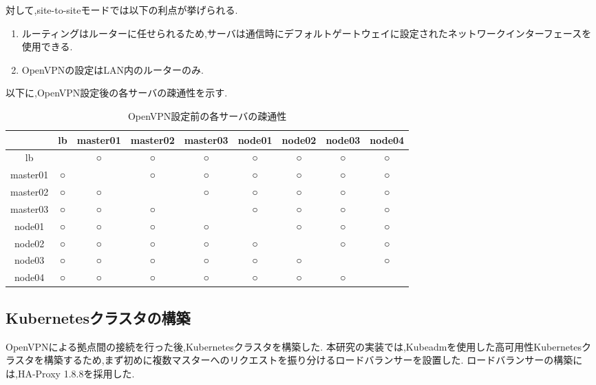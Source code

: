 対して,site-to-siteモードでは以下の利点が挙げられる.

\begin{enumerate}
  \item ルーティングはルーターに任せられるため,サーバは通信時にデフォルトゲートウェイに設定されたネットワークインターフェースを使用できる.
  \item OpenVPNの設定はLAN内のルーターのみ.
\end{enumerate}

以下に,OpenVPN設定後の各サーバの疎通性を示す.

\begin{table}[htb]
  \begin{center}
    \caption{OpenVPN設定前の各サーバの疎通性}
    \begin{tabular}{|c|c|c|c|c|c|c|c|c|} \hline
      & lb & master01 & master02 & master03 & node01 & node02 & node03 & node04 \\ \hline
      lb & \ & ○ & ○ & ○ & ○ & ○ & ○ & ○ \\ \hline
      master01 & ○ & \ & ○ & ○ & ○ & ○ & ○ & ○ \\ \hline
      master02 & ○ & ○ & \ & ○ & ○ & ○ & ○ & ○ \\ \hline
      master03 & ○ & ○ & ○ & \ & ○ & ○ & ○ & ○ \\ \hline
      node01 & ○ & ○ & ○ & ○ & \ & ○ & ○ & ○ \\ \hline
      node02 & ○ & ○ & ○ & ○ & ○ & \ & ○ & ○ \\ \hline
      node03 & ○ & ○ & ○ & ○ & ○ & ○ & \ & ○ \\ \hline
      node04 & ○ & ○ & ○ & ○ & ○ & ○ & ○ & \ \\ \hline
    \end{tabular}
  \end{center}
\end{table}

\subsection{Kubernetesクラスタの構築}

OpenVPNによる拠点間の接続を行った後,Kubernetesクラスタを構築した.
本研究の実装では,Kubeadmを使用した高可用性Kubernetesクラスタを構築するため,まず初めに複数マスターへのリクエストを振り分けるロードバランサーを設置した.
ロードバランサーの構築には,HA-Proxy 1.8.8を採用した.\\


